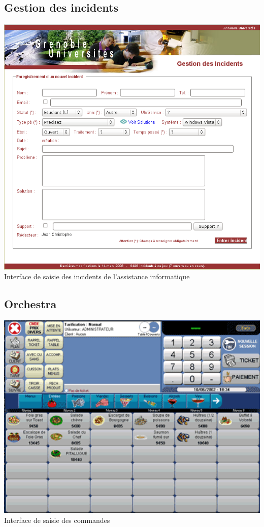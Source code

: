 \subsection{Gestion des incidents}
\label{gestion_incidents}
\begin{center}
	\includegraphics[width=15cm]{annexes/images/gestion_des_incidents.png} \\
	Interface de saisie des incidents de l'assistance informatique
\end{center}

\subsection{Orchestra}
\label{bar_orchestra}
\begin{center}
	\includegraphics[width=15cm]{annexes/images/bar_orchestra.png} \\
	Interface de saisie des commandes
\end{center}

